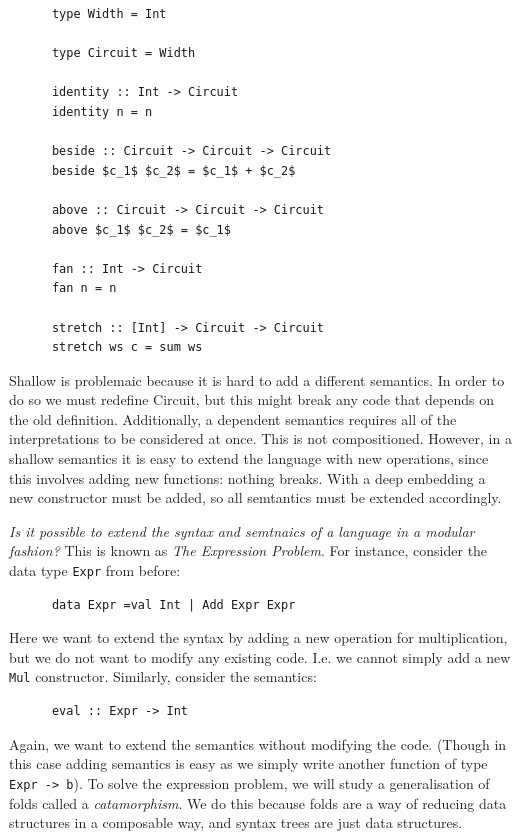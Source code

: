 \documentclass[a4paper,12pt]{article}
\theoremstyle{remark}
\begin{document}
  \begin{lstlisting}
      type Width = Int

      type Circuit = Width

      identity :: Int -> Circuit
      identity n = n

      beside :: Circuit -> Circuit -> Circuit
      beside $c_1$ $c_2$ = $c_1$ + $c_2$

      above :: Circuit -> Circuit -> Circuit
      above $c_1$ $c_2$ = $c_1$

      fan :: Int -> Circuit
      fan n = n

      stretch :: [Int] -> Circuit -> Circuit
      stretch ws c = sum ws  \end{lstlisting}

  Shallow is problemaic because it is hard to add a different semantics. In order
  to do so we must redefine Circuit, but this might break any code that depends on
  the old definition. Additionally, a dependent semantics requires all of the interpretations
  to be considered at once. This is not compositioned. However, in a shallow semantics
  it is easy to extend the language with new operations,
  since this involves adding new functions: nothing breaks. With a deep embedding a
  new constructor must be added, so all semtantics must be extended accordingly.

  \textit{Is it possible to extend the syntax and semtnaics of a language in a
  modular fashion?} This is known as \textit{The Expression Problem}. For instance,
  consider the data type \lstinline{Expr} from before:

  \begin{lstlisting}
      data Expr =val Int | Add Expr Expr  \end{lstlisting}

  Here we want to extend the syntax by adding a new operation for multiplication,
  but we do not want to modify any existing code. I.e. we cannot simply add a new
  \lstinline{Mul} constructor. Similarly, consider the semantics:

  \begin{lstlisting}
      eval :: Expr -> Int  \end{lstlisting}

  Again, we want to extend the semantics without modifying the code. (Though in this
  case adding semantics is easy as we simply write another function of type \lstinline{Expr -> b}).
  To solve the expression problem, we will study a generalisation of folds called
  a \textit{catamorphism}. We do this because folds are a way of reducing data structures in a
  composable way, and syntax trees are just data structures.
\end{document}
